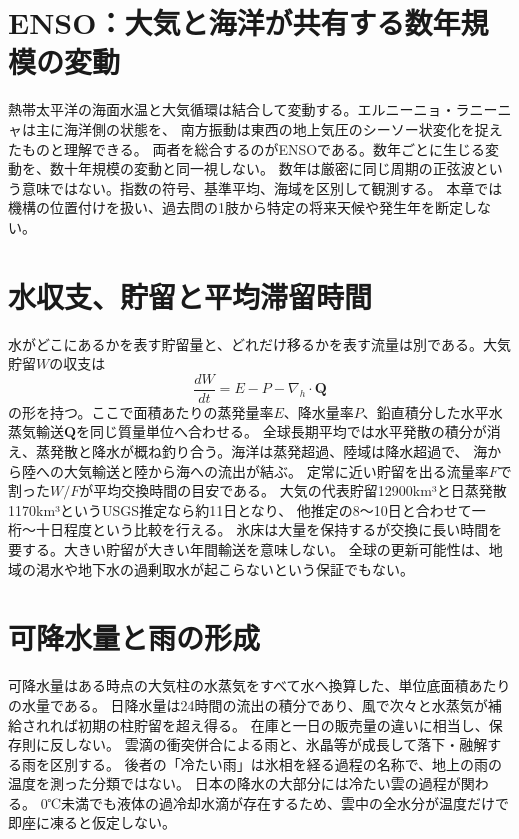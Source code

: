 \section{ENSO：大気と海洋が共有する数年規模の変動}
\label{theory:atmosphere:enso}
熱帯太平洋の海面水温と大気循環は結合して変動する。エルニーニョ・ラニーニャは主に海洋側の状態を、
南方振動は東西の地上気圧のシーソー状変化を捉えたものと理解できる\cite{atm_jma_enso}。
両者を総合するのがENSOである。数年ごとに生じる変動を、数十年規模の変動と同一視しない。
数年は厳密に同じ周期の正弦波という意味ではない。指数の符号、基準平均、海域を区別して観測する。
本章では機構の位置付けを扱い、過去問の1肢から特定の将来天候や発生年を断定しない。

\section{水収支、貯留と平均滞留時間}
\label{theory:atmosphere:water}
水がどこにあるかを表す貯留量と、どれだけ移るかを表す流量は別である。大気貯留\(W\)の収支は
\[
 \frac{dW}{dt}=E-P-\nabla_h\cdot\mathbf Q
\]
の形を持つ。ここで面積あたりの蒸発量率\(E\)、降水量率\(P\)、鉛直積分した水平水蒸気輸送\(\mathbf Q\)を同じ質量単位へ合わせる。
全球長期平均では水平発散の積分が消え、蒸発散と降水が概ね釣り合う。海洋は蒸発超過、陸域は降水超過で、
海から陸への大気輸送と陸から海への流出が結ぶ。
定常に近い貯留を出る流量率\(F\)で割った\(W/F\)が平均交換時間の目安である。
大気の代表貯留12900km³と日蒸発散1170km³というUSGS推定なら約11日となり\cite{atm_usgs_water}、
他推定の8〜10日と合わせて一桁〜十日程度という比較を行える。
氷床は大量を保持するが交換に長い時間を要する\cite{atm_usgs_cycle}。大きい貯留が大きい年間輸送を意味しない。
全球の更新可能性は、地域の渇水や地下水の過剰取水が起こらないという保証でもない。

\section{可降水量と雨の形成}
\label{theory:atmosphere:rain}
可降水量はある時点の大気柱の水蒸気をすべて水へ換算した、単位底面積あたりの水量である\cite{atm_noaa_pwat}。
日降水量は24時間の流出の積分であり、風で次々と水蒸気が補給されれば初期の柱貯留を超え得る。
在庫と一日の販売量の違いに相当し、保存則に反しない。
雲滴の衝突併合による雨と、氷晶等が成長して落下・融解する雨を区別する。
後者の「冷たい雨」は氷相を経る過程の名称で、地上の雨の温度を測った分類ではない。
日本の降水の大部分には冷たい雲の過程が関わる\cite{atm_mri_cloud}。
0℃未満でも液体の過冷却水滴が存在するため、雲中の全水分が温度だけで即座に凍ると仮定しない。

